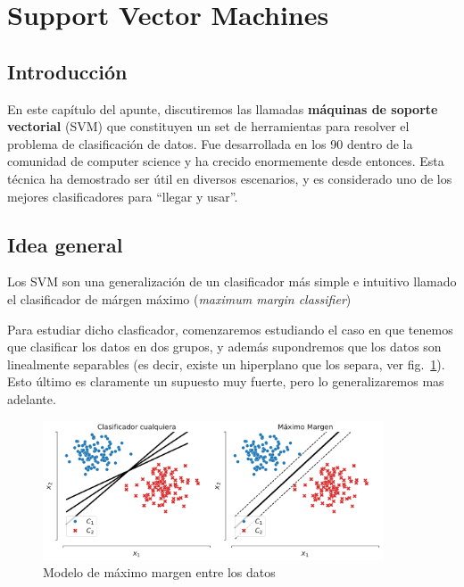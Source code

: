 

\section{Support Vector Machines}

\subsection{Introducción}
\label{sub:svm_intro}

En este capítulo del apunte, discutiremos las llamadas \textbf{máquinas de soporte vectorial} (SVM) que constituyen un set de herramientas para resolver el problema de clasificación de datos. Fue desarrollada en los 90 dentro de la comunidad de computer science y ha crecido enormemente desde entonces. Esta técnica ha demostrado ser útil en diversos escenarios, y es considerado uno de los mejores clasificadores para ``llegar y usar''. 

\subsection{Idea general}


Los SVM son una generalización de un clasificador más simple e intuitivo llamado el clasificador de márgen máximo (\textit{maximum margin classifier})

Para estudiar dicho clasficador, comenzaremos estudiando el caso en que tenemos que clasificar los datos en dos grupos, y además supondremos que los datos son linealmente separables (es decir, existe un hiperplano que los separa, ver fig.~\ref{fig:maxim_marg}). Esto último es claramente un supuesto muy fuerte, pero lo generalizaremos mas adelante. 


\begin{figure}[ht]
    \centering
    \includegraphics[width=0.9\textwidth]{img/cap5_max_margen.pdf}
    \caption{Modelo de máximo margen entre los datos}
    \label{fig:maxim_marg} 
\end{figure}


